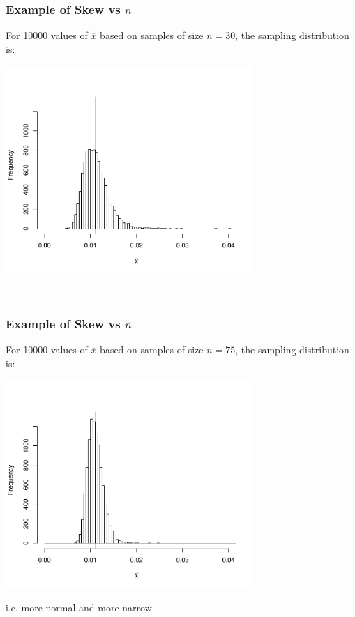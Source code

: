 \documentclass[handout]{beamer}
\newcommand{\blue}[1]{\textcolor{blue2}{#1}}
\newcommand{\white}[1]{\textcolor{white}{#1}}
\newcommand{\xbar}{\overline{x}}
\begin{document}
\begin{frame}
\frametitle{Example of Skew vs $n$}
For 10000 values of $\xbar$ based on samples of size \blue{$n=30$}, the sampling distribution is:
\begin{center}
\includegraphics[width=0.7\textwidth]{figure/hist30.pdf}
\end{center}
\white{i.e. more normal and more narrow}
\end{frame}


\begin{frame}
\frametitle{Example of Skew vs $n$}
For 10000 values of $\xbar$ based on samples of size \blue{$n=75$}, the sampling distribution is:
\begin{center}
\includegraphics[width=0.7\textwidth]{figure/hist75.pdf}
\end{center}
\blue{i.e. more normal and more narrow}
\end{frame}
\end{document}
